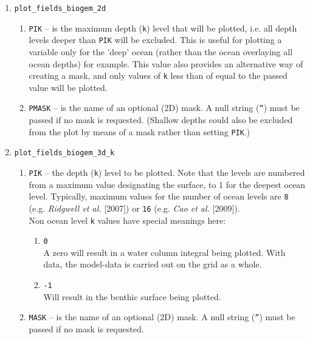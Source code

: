 \documentclass[11pt,fleqn]{book} %
\begin{document}
\begin{enumerate}

\vspace{2pt}
\item \texttt{plot\_fields\_biogem\_2d}
\begin{enumerate}
\vspace{1pt}
\item \texttt{PIK} -- is the maximum depth (\texttt{k}) level that will be plotted, i.e. all depth levels deeper than \texttt{PIK} will be excluded. This is useful for plotting a variable only for the 'deep' ocean (rather than the ocean overlaying all ocean depths) for example. This value also provides an alternative way of creating a mask, and only values of \texttt{k} less than of equal to the passed value will be plotted.
\vspace{1pt}
\item \texttt{PMASK} -- is the name of an optional (2D) mask. A null string (\texttt{''}) must be passed if no mask is requested. (Shallow depths could also be excluded from the plot by means of a mask rather than setting \texttt{PIK}.)
\end{enumerate}

\vspace{2pt}
\item \texttt{plot\_fields\_biogem\_3d\_k}
\begin{enumerate}
\vspace{1pt}
\item \texttt{PIK} -- the depth (\texttt{k}) level to be plotted. Note that the levels are numbered from a maximum value designating the surface, to 1 for the deepest ocean level. Typically, maximum values for the number of ocean levels are \texttt{8} (e.g. \textit{Ridgwell et al.} [2007]) or \texttt{16} (e.g. \textit{Cao et al.} [2009]).
\\Non ocean level \texttt{k} values have special meanings here:
\begin{enumerate}[noitemsep]
\vspace{1pt}
\item \texttt{0}
\\A zero will result in a water column integral being plotted. With data, the model-data is  carried out on the grid as a whole.
\vspace{1pt}
\item \texttt{-1}
\\Will result in the benthic surface being plotted.
\end{enumerate}
\vspace{1pt}
\item \texttt{MASK} -- is the name of an optional (2D) mask. A null string (\texttt{''}) must be passed if no mask is requested.
\end{enumerate}


\end{enumerate}
\end{document}
